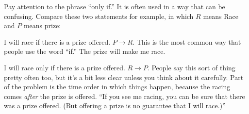 Pay attention to the phrase ``only if.'' It is often used in a way that can be confusing.  Compare these two statements for example, in which $R$ means Race and $P$ means prize:
\blist{0.0in}
\item I will race if there is a prize offered.  $P \to R$.  This is the most common way that people use the word ``if.''  The prize will make me race.
\item I will race only if there is a prize offered.  $R \to P$.  People say this sort of thing pretty often too, but it's a bit less clear unless you think about it carefully.  Part of the problem is the time order in which things happen, because the racing comes {\em after} the prize is offered.  ``If you see me racing, you can be sure that there was a prize offered. (But offering a prize is no guarantee that I will race.)''
\elist



\vfill          %
